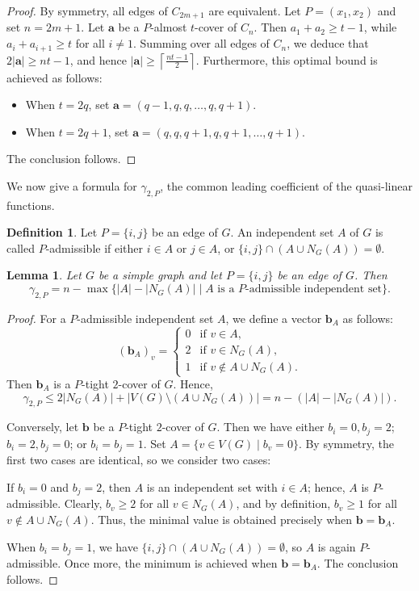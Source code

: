 \documentclass[12pt,amscd]{amsart}
\newtheorem{lem}[thm]{Lemma}
\theoremstyle{definition}
\newtheorem{defn}[thm]{Definition}
\numberwithin{equation}{section}
\begin{document}
\begin{proof}
By symmetry, all edges of $C_{2m+1}$ are equivalent. Let $P = (x_1, x_2)$ and set $n = 2m+1$. Let $\mathbf{a}$ be a $P$-almost $t$-cover of $C_n$. Then $a_1 + a_2 \ge t-1$, while $a_i + a_{i+1} \ge t$ for all $i \neq 1$. Summing over all edges of $C_n$, we deduce that $2|\mathbf{a}| \ge nt - 1$, and hence $|\mathbf{a}| \ge \left\lceil \frac{nt-1}{2} \right\rceil$. Furthermore, this optimal bound is achieved as follows:

\begin{itemize}
    \item When $t = 2q$, set $\mathbf{a} = (q-1, q, q, \ldots, q, q+1)$.
    \item When $t = 2q+1$, set $\mathbf{a} = (q, q, q+1, q, q+1, \ldots, q+1)$.
\end{itemize}
The conclusion follows.
\end{proof}

We now give a formula for $\gamma_{2,P}$, the common leading coefficient of the quasi-linear functions.

\begin{defn}
Let $P = \{i,j\}$ be an edge of $G$. An independent set $A$ of $G$ is called $P$-admissible if either $i \in A$ or $j \in A$, or $\{i,j\} \cap (A \cup N_G(A)) = \emptyset$.
\end{defn}

\begin{lem}\label{lem_2_P}
Let $G$ be a simple graph and let $P = \{i,j\}$ be an edge of $G$. Then
\[
\gamma_{2,P} = n - \max \{ |A| - |N_G(A)| \mid A \text{ is a } P\text{-admissible independent set} \}.
\]
\end{lem}

\begin{proof}
For a $P$-admissible independent set $A$, we define a vector $\mathbf{b}_A$ as follows:
\[
(\mathbf{b}_A)_v = \begin{cases} 
0 & \text{if } v \in A, \\ 
2 & \text{if } v \in N_G(A), \\ 
1 & \text{if } v \notin A \cup N_G(A). 
\end{cases}
\]
Then $\mathbf{b}_A$ is a $P$-tight $2$-cover of $G$. Hence, 
\[
\gamma_{2,P} \le 2|N_G(A)| + |V(G) \setminus (A \cup N_G(A))| = n - (|A| - |N_G(A)|).
\]

Conversely, let $\mathbf{b}$ be a $P$-tight $2$-cover of $G$. Then we have either $b_i = 0, b_j = 2$; $b_i = 2, b_j = 0$; or $b_i = b_j = 1$. Set $A = \{v \in V(G) \mid b_v = 0\}$. By symmetry, the first two cases are identical, so we consider two cases:

If $b_i = 0$ and $b_j = 2$, then $A$ is an independent set with $i \in A$; hence, $A$ is $P$-admissible. Clearly, $b_v \ge 2$ for all $v \in N_G(A)$, and by definition, $b_v \ge 1$ for all $v \notin A \cup N_G(A)$. Thus, the minimal value is obtained precisely when $\mathbf{b} = \mathbf{b}_A$. 

When $b_i = b_j = 1$, we have $\{i,j\} \cap (A \cup N_G(A)) = \emptyset$, so $A$ is again $P$-admissible. Once more, the minimum is achieved when $\mathbf{b} = \mathbf{b}_A$. The conclusion follows.
\end{proof}
\end{document}
